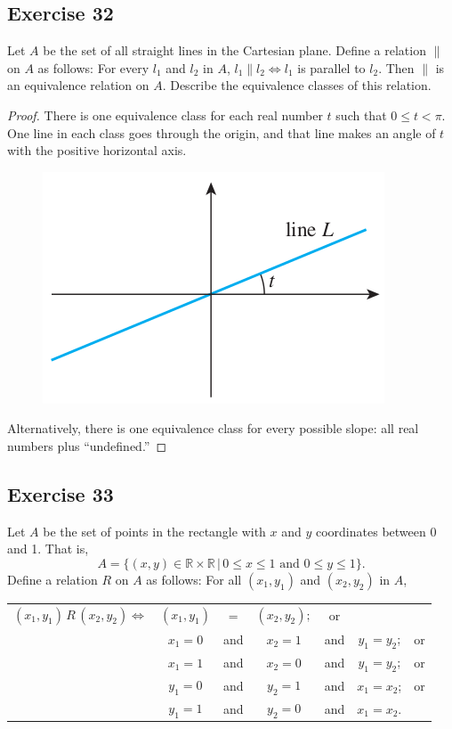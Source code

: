 \documentclass[14pt]{extarticle}
\newcommand{\R}{\mathbb{R}}
\begin{document}
\subsection{Exercise 32}
Let $A$ be the set of all straight lines in the Cartesian plane. Define a relation \(\parallel\) on $A$ as follows: 
For every $l_1$ and $l_2$ in $A$, \(l_1 \parallel l_2 \iff l_1\) is parallel to $l_2$. Then \(\parallel\) is an 
equivalence relation on $A$. Describe the equivalence classes of this relation. 

\begin{proof}
There is one equivalence class for each real number $t$ such that \(0 \leq t < \pi\). One line in each class goes 
through the origin, and that line makes an angle of $t$ with the positive horizontal axis.

\begin{figure}[ht!]
\centering
\includegraphics[scale=0.5]{../images/8.3.32.png}
\end{figure}

Alternatively, there is one equivalence class for every
possible slope: all real numbers plus “undefined.”
\end{proof}

\subsection{Exercise 33}
Let $A$ be the set of points in the rectangle with $x$ and $y$ coordinates between 0 and 1. That is, 
\[A = \{(x, y) \in \R \times \R \,|\, 0 \leq x \leq 1 \text{ and } 0 \leq y \leq 1\}.
\] 
Define a relation $R$ on $A$ as follows: For all \((x_1, y_1)\) and \((x_2, y_2)\) in $A$, 

\begin{center}
\begin{tabular}{ccccccc}
\((x_1, y_1) \,R\, (x_2, y_2) \iff\) &\((x_1, y_1)\) & = & \((x_2, y_2);\) & or \\
&\(x_1=0\) & and & \(x_2=1\) & and & \(y_1 = y_2\); & or \\
&\(x_1=1\) & and & \(x_2=0\) & and & \(y_1 = y_2\); & or \\
&\(y_1=0\) & and & \(y_2=1\) & and & \(x_1 = x_2\); & or \\
&\(y_1=1\) & and & \(y_2=0\) & and & \(x_1 = x_2\). 
\end{tabular}
\end{center}
\end{document}
